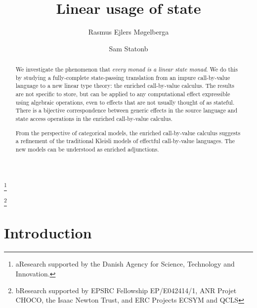 \documentclass{LMCS}
\begin{document}
\title[Linear usage of state]{Linear usage of state\rsuper*}

\author[R.~E.~M{\o}gelberg]{Rasmus Ejlers M{\o}gelberg\rsuper a}
\address{{\lsuper a}IT University of Copenhagen, Denmark}
\thanks{{\lsuper a}Research supported by the Danish Agency for Science, Technology and Innovation.}

\author[S.~Staton]{Sam Staton\rsuper b}
\address{{\lsuper b}Radboud University Nijmegen, Netherlands}
\thanks{{\lsuper b}Research supported by EPSRC Fellowship EP/E042414/1,
ANR Projet CHOCO, the Isaac Newton Trust, and ERC Projects ECSYM and QCLS}




\begin{abstract}
  We investigate the phenomenon that \emph{every monad is a linear state
  monad}. We do this by studying a fully-complete state-passing
  translation from an impure call-by-value language to a new linear
  type theory: the enriched call-by-value calculus.  The results are not specific
  to store, but can be applied to any computational effect expressible
  using algebraic operations, even
  to effects that are not usually thought of as stateful.  There is a
  bijective correspondence between 
  generic effects in the source language
  and state access operations in the enriched call-by-value calculus.
\vspace{2mm}

  From the perspective of categorical models, the enriched call-by-value calculus 
  suggests a refinement of the traditional Kleisli models of effectful
  call-by-value 
  languages. The new models can be understood as enriched adjunctions.
\end{abstract}

\maketitle


\section{Introduction}
\end{document}
